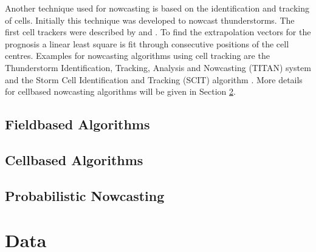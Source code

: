 \documentclass[11pt,twoside,a4paper,fleqn,x11names]{report}
\numberwithin{equation}{chapter}
\numberwithin{figure}{chapter}
\numberwithin{table}{chapter}
\begin{document}
Another technique used for nowcasting is based on the identification and tracking of cells. Initially this technique was developed to nowcast thunderstorms. The first cell trackers were described by \cite{wilk1970} and \cite{zittel1977}. To find the extrapolation vectors for the prognosis a linear least square is fit through consecutive positions of the cell centres. Examples for nowcasting algorithms using cell tracking are the Thunderstorm Identification, Tracking, Analysis and Nowcasting (TITAN) system \citep{dixon1993} and the Storm Cell Identification and Tracking (SCIT) algorithm \citep{witt1993}. More details for cellbased nowcasting algorithms will be given in Section \ref{sec:cell}.\\

\section{Fieldbased Algorithms}
\label{sec:field}
\section{Cellbased Algorithms}
\label{sec:cell}
\section{Probabilistic Nowcasting}
\label{sec:prob}
\chapter{Data}
\label{chap:data}
\end{document}

